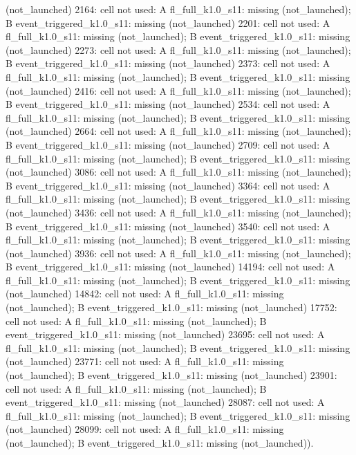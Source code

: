 \begin{table}[t]
{(not\_launched) \textbar{} 2164: cell not used: A fl\_full\_k1.0\_s11: missing (not\_launched); B event\_triggered\_k1.0\_s11: missing (not\_launched) \textbar{} 2201: cell not used: A fl\_full\_k1.0\_s11: missing (not\_launched); B event\_triggered\_k1.0\_s11: missing (not\_launched) \textbar{} 2273: cell not used: A fl\_full\_k1.0\_s11: missing (not\_launched); B event\_triggered\_k1.0\_s11: missing (not\_launched) \textbar{} 2373: cell not used: A fl\_full\_k1.0\_s11: missing (not\_launched); B event\_triggered\_k1.0\_s11: missing (not\_launched) \textbar{} 2416: cell not used: A fl\_full\_k1.0\_s11: missing (not\_launched); B event\_triggered\_k1.0\_s11: missing (not\_launched) \textbar{} 2534: cell not used: A fl\_full\_k1.0\_s11: missing (not\_launched); B event\_triggered\_k1.0\_s11: missing (not\_launched) \textbar{} 2664: cell not used: A fl\_full\_k1.0\_s11: missing (not\_launched); B event\_triggered\_k1.0\_s11: missing (not\_launched) \textbar{} 2709: cell not used: A fl\_full\_k1.0\_s11: missing (not\_launched); B event\_triggered\_k1.0\_s11: missing (not\_launched) \textbar{} 3086: cell not used: A fl\_full\_k1.0\_s11: missing (not\_launched); B event\_triggered\_k1.0\_s11: missing (not\_launched) \textbar{} 3364: cell not used: A fl\_full\_k1.0\_s11: missing (not\_launched); B event\_triggered\_k1.0\_s11: missing (not\_launched) \textbar{} 3436: cell not used: A fl\_full\_k1.0\_s11: missing (not\_launched); B event\_triggered\_k1.0\_s11: missing (not\_launched) \textbar{} 3540: cell not used: A fl\_full\_k1.0\_s11: missing (not\_launched); B event\_triggered\_k1.0\_s11: missing (not\_launched) \textbar{} 3936: cell not used: A fl\_full\_k1.0\_s11: missing (not\_launched); B event\_triggered\_k1.0\_s11: missing (not\_launched) \textbar{} 14194: cell not used: A fl\_full\_k1.0\_s11: missing (not\_launched); B event\_triggered\_k1.0\_s11: missing (not\_launched) \textbar{} 14842: cell not used: A fl\_full\_k1.0\_s11: missing (not\_launched); B event\_triggered\_k1.0\_s11: missing (not\_launched) \textbar{} 17752: cell not used: A fl\_full\_k1.0\_s11: missing (not\_launched); B event\_triggered\_k1.0\_s11: missing (not\_launched) \textbar{} 23695: cell not used: A fl\_full\_k1.0\_s11: missing (not\_launched); B event\_triggered\_k1.0\_s11: missing (not\_launched) \textbar{} 23771: cell not used: A fl\_full\_k1.0\_s11: missing (not\_launched); B event\_triggered\_k1.0\_s11: missing (not\_launched) \textbar{} 23901: cell not used: A fl\_full\_k1.0\_s11: missing (not\_launched); B event\_triggered\_k1.0\_s11: missing (not\_launched) \textbar{} 28087: cell not used: A fl\_full\_k1.0\_s11: missing (not\_launched); B event\_triggered\_k1.0\_s11: missing (not\_launched) \textbar{} 28099: cell not used: A fl\_full\_k1.0\_s11: missing (not\_launched); B event\_triggered\_k1.0\_s11: missing (not\_launched)). 
}
\end{table}
